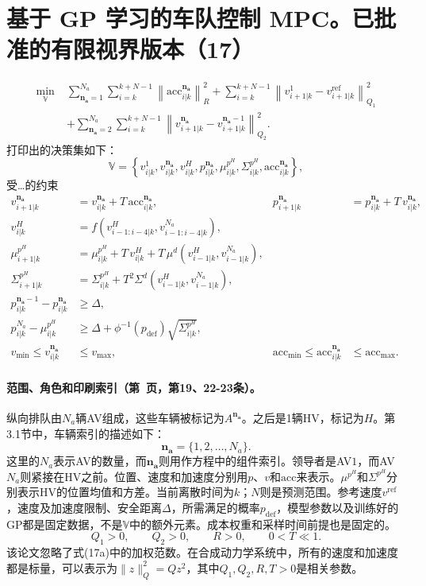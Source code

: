 \documentclass{article}
\begin{document}
\section*{基于 GP 学习的车队控制 MPC。已批准的有限视界版本（17）}
\begin{equation}
\begin{aligned}
\min_{\mathbb V}\;&
\sum_{\mathbf{n_a}=1}^{N_a}\sum_{i=k}^{k+N-1}
 \left\|\mathrm{acc}_{i|k}^{\mathbf{n_a}}\right\|_R^2
+\sum_{i=k}^{k+N-1}
 \left\|v_{i+1|k}^{1}-v_{i+1|k}^{\mathrm{ref}}\right\|_{Q_1}^2\\
&+\sum_{\mathbf{n_a}=2}^{N_a}\sum_{i=k}^{k+N-1}
 \left\|v_{i+1|k}^{\mathbf{n_a}}-v_{i+1|k}^{\mathbf{n_a}-1}\right\|_{Q_2}^2 .
\end{aligned}\tag{17a}
\end{equation}
打印出的决策集如下：
\[
\mathbb V=\left\{v_{i|k}^{1},v_{i|k}^{\mathbf{n_a}},v_{i|k}^{H},
 p_{i|k}^{\mathbf{n_a}},\mu_{i|k}^{p^H},\Sigma_{i|k}^{p^H},
 \mathrm{acc}_{i|k}^{\mathbf{n_a}}\right\},
\]
受…的约束
\begin{align}
v_{i+1|k}^{\mathbf{n_a}}&=v_{i|k}^{\mathbf{n_a}}+T\,\mathrm{acc}_{i|k}^{\mathbf{n_a}},
& p_{i+1|k}^{\mathbf{n_a}}&=p_{i|k}^{\mathbf{n_a}}+T\,v_{i|k}^{\mathbf{n_a}},\tag{17b}\\
v_{i|k}^{H}&=f\left(v_{i-1:i-4|k}^{H},v_{i-1:i-4|k}^{N_a}\right),\tag{17c}\\
\mu_{i+1|k}^{p^H}&=\mu_{i|k}^{p^H}+T\,v_{i|k}^{H}
 +T\,\mu^d\left(v_{i-1|k}^{H},v_{i-1|k}^{N_a}\right),\tag{17d}\\
\Sigma_{i+1|k}^{p^H}&=\Sigma_{i|k}^{p^H}
 +T^2\Sigma^d\left(v_{i-1|k}^{H},v_{i-1|k}^{N_a}\right),\tag{17e}\\
p_{i|k}^{\mathbf{n_a}-1}-p_{i|k}^{\mathbf{n_a}}&\geq\Delta,\tag{17f}\\
p_{i|k}^{N_a}-\mu_{i|k}^{p^H}&\geq\Delta+\phi^{-1}(p_{\mathrm{def}})
 \sqrt{\Sigma_{i|k}^{p^H}},\tag{17g}\\
v_{\min}\leq v_{i|k}^{\mathbf{n_a}}&\leq v_{\max},
&\mathrm{acc}_{\min}\leq\mathrm{acc}_{i|k}^{\mathbf{n_a}}&\leq\mathrm{acc}_{\max}.\tag{17h}
\end{align}

\paragraph{范围、角色和印刷索引（第\ 页，第19、22-23条）。}
纵向排队由$N_a$辆AV组成，这些车辆被标记为$A^{\mathbf{n_a}}$。之后是1辆HV，标记为$H$。第3.1节中，车辆索引的描述如下：
\[
\mathbf{n_a}=\{1,2,\ldots,N_a\}.
\]
这里的$N_a$表示AV的数量，而$\mathbf{n_a}$则用作方程中的组件索引。领导者是AV$1$，而AV$N_a$则紧接在HV之前。位置、速度和加速度分别用$p$、$v$和$\mathrm{acc}$来表示。$\mu^{p^H}$和$\Sigma^{p^H}$分别表示HV的位置均值和方差。当前离散时间为$k$；$N$则是预测范围。参考速度$v^{\mathrm{ref}}$，速度及加速度限制、安全距离$\Delta$，所需满足的概率$p_{\mathrm{def}}$，模型参数以及训练好的GP都是固定数据，不是$\mathbb V$中的额外元素。成本权重和采样时间前提也是固定的。
\[
Q_1>0,\qquad Q_2>0,\qquad R>0,\qquad 0<T\ll1.
\]
该论文忽略了式(17a)中的加权范数。在合成动力学系统中，所有的速度和加速度都是标量，可以表示为$\|z\|^2_Q=Qz^2$，其中$Q_1,Q_2,R,T>0$是相关参数。
\end{document}
